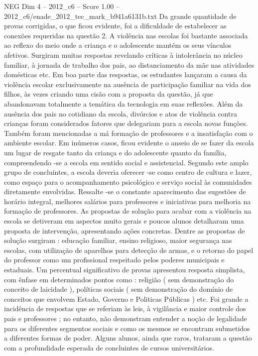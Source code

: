 \begin{textsample}{NEG Dim 4 – 2012\_c6 – Score 1.00 – 2012\_c6/enade\_2012\_tec\_mark\_b941a6131b.txt}
Da grande quantidade de provas corrigidas, o que ficou evidente, foi a dificuldade de estabelecer as conexões requeridas na questão 2.
A violência nas escolas foi bastante associada ao reflexo do meio onde a criança e o adolescente mantém os seus vínculos afetivos.
Surgiram muitas respostas revelando críticas à intolerância no núcleo familiar, à jornada de trabalho dos pais, ao distanciamento da mãe nas atividades domésticas etc.
Em boa parte das respostas, os estudantes lançaram a causa da violência escolar exclusivamente na ausência de participação familiar na vida dos filhos, às vezes criando uma cisão com a proposta da questão, já que abandonavam totalmente a temática da tecnologia em suas reflexões.
Além da ausência dos pais no cotidiano da escola, divórcios e atos de violência contra crianças foram considerados fatores que delegariam para a escola novas funções.
Também foram mencionadas a má formação de professores e a insatisfação com o ambiente escolar.
Em inúmeros casos, ficou evidente o anseio de se fazer da escola um lugar de resgate tanto da criança e do adolescente quanto da família, compreendendo -se a escola em sentido social e assistencial.
Segundo este amplo grupo de concluintes, a escola deveria oferecer -se como centro de cultura e lazer, como espaço para o acompanhamento psicológico e serviço social às comunidades diretamente envolvidas.
Ressalte -se o constante aparecimento das sugestões de horário integral, melhores salários para professores e iniciativas para melhoria na formação de professores.
As propostas de solução para acabar com a violência na escola se detiveram em aspectos muito gerais e poucos alunos detalharam uma proposta de intervenção, apresentando ações concretas.
Dentre as propostas de solução surgiram : educação familiar, ensino religioso, maior segurança nas escolas, com utilização de aparelhos para detecção de armas, e o retorno do papel do professor como um profissional respeitado pelos poderes municipais e estaduais.
Um percentual significativo de provas apresentou resposta simplista, com ênfase em determinados pontos como : religião ( sem demonstração do conceito de laicidade ), políticas sociais ( sem demonstração do domínio de conceitos que envolvem Estado, Governo e Politicas Públicas ) etc.
Foi grande a incidência de respostas que se referiam às leis, à vigilância e maior controle dos pais e professores ; no entanto, não demonstram entender a noção de legalidade para os diferentes segmentos sociais e como os mesmos se encontram submetidos a diferentes formas de poder.
Alguns alunos, ainda que raros, trataram a questão com a profundidade esperada de concluintes de cursos universitários.

\end{textsample}
